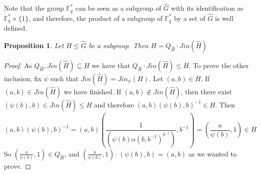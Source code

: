 \documentclass{article}
\newtheorem{proposition}[theorem]{Proposition}
\begin{document}
Note that the group $\mathbb{F}_q^*$ can be seen as a subgroup of $\hat{G}$ with its identification as $\mathbb{F}_q^*\times \{1\}$, and therefore, the product of a subgroup of $\mathbb{F}_q^*$ by a set of $\hat{G}$ is well defined.
\begin{proposition}
    Let $H\leq \hat{G}$ be a subgroup. Then $H=Q_{\hat{H}} \cdot Jin(\hat{H})$
\end{proposition}
\begin{proof}
    As $Q_{\hat{H}} , Jin(\hat{H}) \subseteq H$ we have that $Q_{\hat{H}} \cdot Jin(\hat{H}) \leq H$. To prove the other inclusion, fix $\psi $ such that $Jin(\hat{H}) = Jin_\psi (H)$. Let $(a,b)\in H$. If $(a,b)\in Jin(\hat{H})$ we have finished. If $(a,b) \not \in Jin(\hat{H})$, then there exist $(\psi(b),b) \in Jin(\hat{H}) \leq H$ and therefore $(a,b) (\psi(b),b)^{-1} \in H$. Then
    \begin{equation}
        (a,b) (\psi(b),b)^{-1}  = (a,b) \left(\frac{1}{(\psi(b)\alpha(b, b^{-1})^{b^{-1}})}, b^{-1} \right) = \left(\frac{a}{\psi(b)},1\right) \in H
    \end{equation}
    So $\left(\frac{a}{\psi(b)},1\right)  \in Q_{\hat{H}}$, and $\left(\frac{a}{\psi(b)},1\right)  \cdot (\psi(b),b) = (a,b)$ as we wanted to prove. 
\end{proof}
\end{document}
